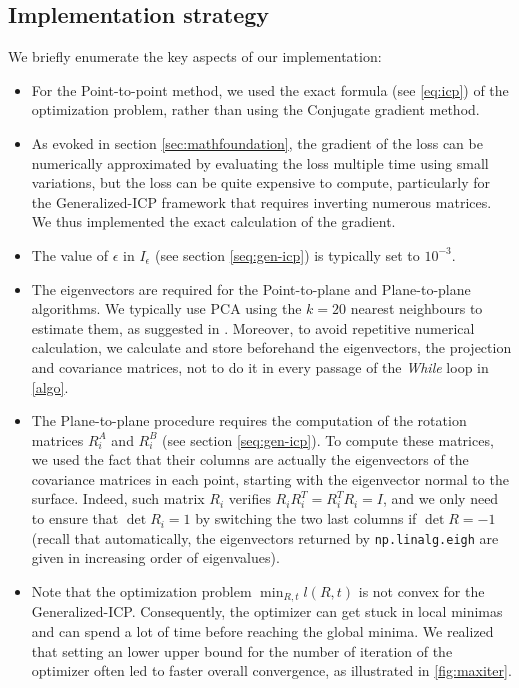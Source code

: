 \documentclass[11pt,letterpaper,leqno]{article}
\begin{document}
\subsection{Implementation strategy}
We briefly enumerate the key aspects of our implementation:
\begin{itemize}
    \item For the Point-to-point method, we used the exact formula (see \ref{eq:icp}) of the optimization problem, rather than using the Conjugate gradient method.
    \item As evoked in section \ref{sec:mathfoundation}, the gradient of the loss can be numerically approximated by evaluating the loss multiple time using small variations, but the loss can be quite expensive to compute, particularly for the Generalized-ICP framework that requires inverting numerous matrices. We thus implemented the exact calculation of the gradient.
    \item The value of $\epsilon$ in $I_\epsilon$ (see section \ref{seq:gen-icp}) is typically set to $10^{-3}$.
    \item The eigenvectors are required for the Point-to-plane and Plane-to-plane algorithms. We typically use PCA using the $k = 20$ nearest neighbours to estimate them, as suggested in \cite{generalized-icp}. Moreover, to avoid repetitive numerical calculation, we calculate and store beforehand the eigenvectors, the projection and covariance matrices, not to do it in every passage of the \textit{While} loop in \autoref{algo}.
    \item The Plane-to-plane procedure requires the computation of the rotation matrices $R_i^A$ and $R_i^B$ (see section \ref{seq:gen-icp}). To compute these matrices, we used the fact that their columns are actually the eigenvectors of the covariance matrices in each point, starting with the eigenvector normal to the surface. Indeed, such matrix $R_i$ verifies $R_i R_i^T = R_i^T R_i =I$, and we only need to ensure that $\det R_i = 1$ by switching the two last columns if $\det R = -1$ (recall that automatically, the eigenvectors returned by \texttt{np.linalg.eigh} are given in increasing order of eigenvalues).
    \item Note that the optimization problem $\min_{R,t} l(R,t)$ is not convex for the Generalized-ICP. Consequently, the optimizer can get stuck in local minimas and can spend a lot of time before reaching the global minima. We realized that setting an lower upper bound for the number of iteration of the optimizer often led to faster overall convergence, as illustrated in \ref{fig:maxiter}.
\end{itemize}
\end{document}
